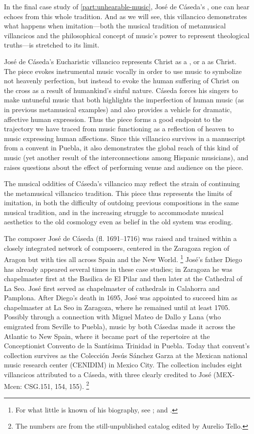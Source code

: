 In the final case study of \cref{part:unhearable-music}, José de Cáseda's , one can hear echoes from this whole tradition.
And as we will see, this villancico demonstrates what happens when imitation---both the musical tradition of metamusical villancicos and the philosophical concept of music's power to represent theological truths---is stretched to its limit.

José de Cáseda's Eucharistic villancico  represents Christ as a , or a  as Christ.
The piece evokes instrumental music vocally in order to use music to symbolize not heavenly perfection, but instead to evoke the human suffering of Christ on the cross as a result of humankind's sinful nature.
Cáseda forces his singers to make untuneful music that both highlights the imperfection of human music (as in previous metamusical examples) and also provides a vehicle for dramatic, affective human expression. 
Thus the piece forms a good endpoint to the trajectory we have traced from music functioning as a reflection of heaven to music expressing human affections.
Since this villancico survives in a manuscript from a convent in Puebla, it also demonstrates the global reach of this kind of music (yet another result of the interconnections among Hispanic musicians), and raises questions about the effect of performing venue and audience on the piece.

The musical oddities of Cáseda's villancico may reflect the strain of continuing the metamusical villancico tradition.
This piece thus represents the limits of imitation, in both the difficulty of outdoing previous compositions in the same musical tradition, and in the increasing struggle to accommodate musical aesthetics to the old cosmology even as belief in the old system was eroding.

The composer José de Cáseda (fl. 1691--1716) was raised and trained within a closely integrated network of composers, centered in the Zaragoza region of Aragon but with ties all across Spain and the New World.%
	\footnote{
For what little is known of his biography, see \autocite[120--121]{Calahorra:Zaragoza2}; and \autocite{Stevenson:CasedaD}. 
	}
José's father Diego has already appeared several times in these case studies; in Zaragoza he was chapelmaster first at the Basilica de El Pilar and then later at the Cathedral of La Seo.
José first served as chapelmaster of cathedrals in Calahorra and Pamplona. 
After Diego's death in 1695, José was appointed to succeed him as chapelmaster at La Seo in Zaragoza, where he remained until at least 1705.
Possibly through a connection with Miguel Mateo de Dallo y Lana (who emigrated from Seville to Puebla), music by both Cásedas made it across the Atlantic to New Spain, where it became part of the repertoire at the Conceptionist Convento de la Santísima Trinidad in Puebla.
Today that convent's collection survives as the Colección Jesús Sánchez Garza at the Mexican national music research center (CENIDIM) in Mexico City.
The collection includes eight villancicos attributed to a Cáseda, with three clearly credited to José (MEX-Mcen: CSG.151, 154, 155).%
	\footnote{
	The numbers are from the still-unpublished catalog edited by Aurelio Tello.
	}

